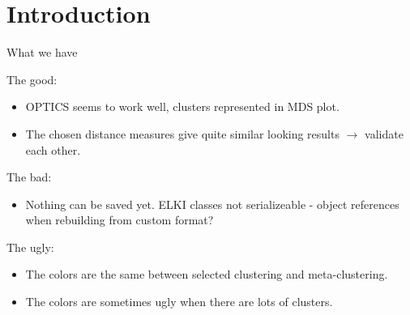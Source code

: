\documentclass{beamer}
\begin{document}
\section{Introduction}

\begin{frame}{What we have}

The good:
\begin{itemize}
  \item OPTICS seems to work well, clusters represented in MDS plot.
  \item The chosen distance measures give quite similar looking results $\rightarrow$ validate each other.
\end{itemize}
The bad:
\begin{itemize}
  \item Nothing can be saved yet. ELKI classes not serializeable - object references when rebuilding from custom format?
\end{itemize}
The ugly:
\begin{itemize}
  \item The colors are the same between selected clustering and meta-clustering.
  \item The colors are sometimes ugly when there are lots of clusters. 
\end{itemize}

\end{frame}

%

\end{document}
